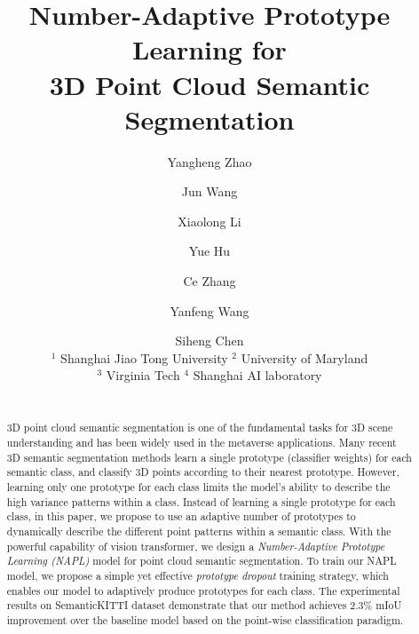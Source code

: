 \documentclass[runningheads]{llncs}
\begin{document}
\pagestyle{headings}
\mainmatter
\def\ECCVSubNumber{}  

\title{Number-Adaptive Prototype Learning for \\ 3D Point Cloud Semantic Segmentation}

\begin{comment}
\titlerunning{ECCV-22 submission ID \ECCVSubNumber} 
\authorrunning{ECCV-22 submission ID \ECCVSubNumber} 
\author{Anonymous ECCV submission}
\institute{}
\end{comment}


\author{Yangheng Zhao \and
Jun Wang \and
Xiaolong Li \and
Yue Hu \and
Ce Zhang \and 
Yanfeng Wang  \and
Siheng Chen  
\\[.21cm]
$^{1}$ Shanghai Jiao Tong University \quad
$^{2}$ University of Maryland \\
$^{3}$ Virginia Tech \quad
$^{4}$ Shanghai AI laboratory \\
\tt\small {}  
}
\institute{}
\maketitle

\begin{abstract}
3D point cloud semantic segmentation is one of the fundamental tasks for 3D scene understanding and 
has been widely used in the metaverse applications. 
Many recent 3D semantic segmentation methods learn a single prototype (classifier weights) for each semantic class, and classify 3D points according to their nearest prototype.  However, learning only one prototype for each class limits the model's ability to describe the high variance patterns within a class.  Instead of learning a single prototype for each class, in this paper, we propose to use an adaptive number of prototypes to dynamically describe the different point patterns within a semantic class. 
With the powerful capability of vision transformer, we design a \textit{Number-Adaptive Prototype Learning (NAPL)} model for point cloud semantic segmentation. To train our NAPL model, we propose a simple yet effective \textit{prototype dropout} training strategy, which enables our model to adaptively produce prototypes for each class. The experimental results on SemanticKITTI dataset demonstrate that our method achieves 2.3\% mIoU improvement over the baseline model based on the point-wise classification paradigm. 
\end{abstract}
\end{document}
